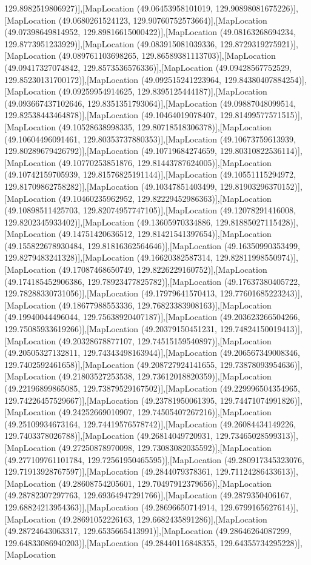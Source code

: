 129.8982519806927)],[MapLocation (49.06453958101019, 129.90898081675226)],[MapLocation (49.0680261524123, 129.90760752573664)],[MapLocation (49.07398649814952, 129.89816615000422)],[MapLocation (49.08163268694234, 129.8773951233929)],[MapLocation (49.083915081039336, 129.8729319275921)],[MapLocation (49.089761103698265, 129.86589381113703)],[MapLocation (49.09417327074842, 129.8573536576336)],[MapLocation (49.09428567752529, 129.85230131700172)],[MapLocation (49.092515241223964, 129.84380407884254)],[MapLocation (49.09259954914625, 129.8395125444187)],[MapLocation (49.093667437102646, 129.8351351793064)],[MapLocation (49.09887048099514, 129.82538443464878)],[MapLocation (49.10464019078407, 129.81499577571515)],[MapLocation (49.10528638998335, 129.80718518306378)],[MapLocation (49.10604496091461, 129.80353737880353)],[MapLocation (49.10673759613939, 129.80289679426792)],[MapLocation (49.10719684274659, 129.80310822536114)],[MapLocation (49.10770253851876, 129.81443787624005)],[MapLocation (49.10742159705939, 129.81576825191144)],[MapLocation (49.10551115294972, 129.81709862758282)],[MapLocation (49.10347851403499, 129.81903296370152)],[MapLocation (49.10460235962952, 129.82229452986363)],[MapLocation (49.10898511425703, 129.82074957747105)],[MapLocation (49.12078291416008, 129.8202345933402)],[MapLocation (49.13605970334886, 129.81885027115428)],[MapLocation (49.14751420636512, 129.81421541397654)],[MapLocation (49.155822678930484, 129.81816362564646)],[MapLocation (49.16350990353499, 129.8279483241328)],[MapLocation (49.16620382587314, 129.82811998550974)],[MapLocation (49.17087468650749, 129.8226229160752)],[MapLocation (49.174185452906386, 129.78923477825782)],[MapLocation (49.17637380405722, 129.78288330731056)],[MapLocation (49.17979641570413, 129.77601685223243)],[MapLocation (49.18677988553336, 129.76823383908163)],[MapLocation (49.19940044496044, 129.75638920407187)],[MapLocation (49.203623266504266, 129.75085933619266)],[MapLocation (49.20379150451231, 129.74824150019413)],[MapLocation (49.20328678877107, 129.74515159540897)],[MapLocation (49.20505327132811, 129.74343498163944)],[MapLocation (49.206567349008346, 129.7402592461658)],[MapLocation (49.208727924141655, 129.73878093954636)],[MapLocation (49.21803527253538, 129.73612018820359)],[MapLocation (49.22196899865085, 129.73879529167502)],[MapLocation (49.229996504354965, 129.74226457529667)],[MapLocation (49.23781950061395, 129.74471074991826)],[MapLocation (49.24252669010907, 129.74505407267216)],[MapLocation (49.25109934673164, 129.74419576578742)],[MapLocation (49.26084434149226, 129.7403378026788)],[MapLocation (49.26814049720931, 129.73465028599313)],[MapLocation (49.27250878970098, 129.73083082035592)],[MapLocation (49.277109761101784, 129.72561950465595)],[MapLocation (49.280917345323076, 129.71913928767597)],[MapLocation (49.2844079378361, 129.71124286433613)],[MapLocation (49.28608754205601, 129.70497912379656)],[MapLocation (49.28782307297763, 129.69364947291766)],[MapLocation (49.2879350406167, 129.68824213954363)],[MapLocation (49.28696650714914, 129.6799165627614)],[MapLocation (49.28691052226163, 129.6682435891286)],[MapLocation (49.28724643063317, 129.6535665413991)],[MapLocation (49.28646264087299, 129.64833086940203)],[MapLocation (49.28440116848355, 129.64355734295228)],[MapLocation 